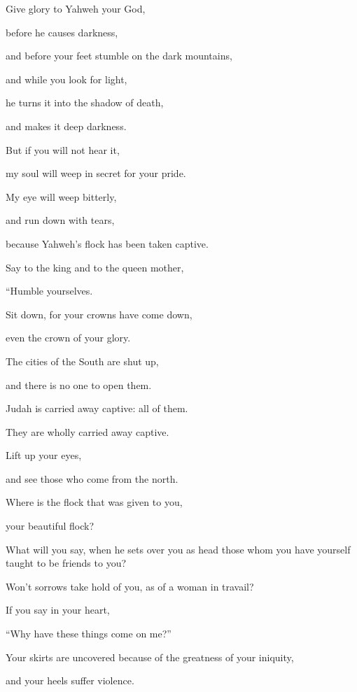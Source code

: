 {\par }{\Q {}Give glory to Yahweh your God,
\par }{\QB before he causes darkness,
\par }{\QB and before your feet stumble on the dark mountains,
\par }{\Q and while you look for light,
\par }{\QB he turns it into the shadow of death,
\par }{\QB and makes it deep darkness.
\par }{\Q {}But if you will not hear it,
\par }{\QB my soul will weep in secret for your pride.
\par }{\Q My eye will weep bitterly,
\par }{\QB and run down with tears,
\par }{\QB because Yahweh’s flock has been taken captive.
\par }{\Q {}Say to the king and to the queen mother,
\par }{\QB “Humble yourselves.
\par }{\Q Sit down, for your crowns have come down,
\par }{\QB even the crown of your glory.
\par }{\Q {}The cities of the South are shut up,
\par }{\QB and there is no one to open them.
\par }{\Q Judah is carried away captive: all of them.
\par }{\QB They are wholly carried away captive.
\par }{\Q {}Lift up your eyes,
\par }{\QB and see those who come from the north.
\par }{\Q Where is the flock that was given to you,
\par }{\QB your beautiful flock?
\par }{\Q {}What will you say, when he sets over you as head those whom you have yourself taught to be friends to you?
\par }{\QB Won’t sorrows take hold of you, as of a woman in travail?
\par }{\Q {}If you say in your heart,
\par }{\QB “Why have these things come on me?”
\par }{\Q Your skirts are uncovered because of the greatness of your iniquity,
\par }{\QB and your heels suffer violence.
}
